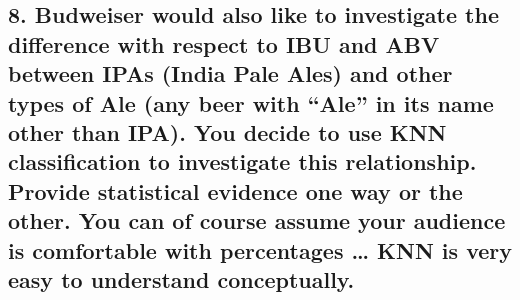 \documentclass[
]{article}
\begin{document}
\hypertarget{budweiser-would-also-like-to-investigate-the-difference-with-respect-to-ibu-and-abv-between-ipas-india-pale-ales-and-other-types-of-ale-any-beer-with-ale-in-its-name-other-than-ipa.-you-decide-to-use-knn-classification-to-investigate-this-relationship.-provide-statistical-evidence-one-way-or-the-other.-you-can-of-course-assume-your-audience-is-comfortable-with-percentages-knn-is-very-easy-to-understand-conceptually.}{%
\subsection{8. Budweiser would also like to investigate the difference
with respect to IBU and ABV between IPAs (India Pale Ales) and other
types of Ale (any beer with ``Ale'' in its name other than IPA). You
decide to use KNN classification to investigate this relationship.
Provide statistical evidence one way or the other. You can of course
assume your audience is comfortable with percentages \ldots{} KNN is
very easy to understand
conceptually.}\label{budweiser-would-also-like-to-investigate-the-difference-with-respect-to-ibu-and-abv-between-ipas-india-pale-ales-and-other-types-of-ale-any-beer-with-ale-in-its-name-other-than-ipa.-you-decide-to-use-knn-classification-to-investigate-this-relationship.-provide-statistical-evidence-one-way-or-the-other.-you-can-of-course-assume-your-audience-is-comfortable-with-percentages-knn-is-very-easy-to-understand-conceptually.}}
\end{document}
